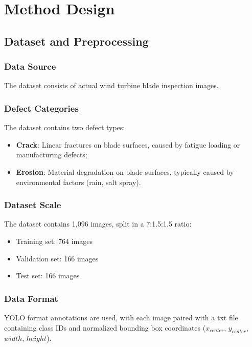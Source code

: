 \documentclass[12pt,a4paper]{article}
\begin{document}
\section{Method Design}

\subsection{Dataset and Preprocessing}

\subsubsection{Data Source}
The dataset consists of actual wind turbine blade inspection images.

\subsubsection{Defect Categories}
The dataset contains two defect types:
\begin{itemize}[noitemsep]
  \item \textbf{Crack}: Linear fractures on blade surfaces, caused by fatigue loading or manufacturing defects;
  \item \textbf{Erosion}: Material degradation on blade surfaces, typically caused by environmental factors (rain, salt spray).
\end{itemize}

\subsubsection{Dataset Scale}
The dataset contains 1,096 images, split in a 7:1.5:1.5 ratio:
\begin{itemize}[noitemsep]
  \item Training set: 764 images
  \item Validation set: 166 images
  \item Test set: 166 images
\end{itemize}

\subsubsection{Data Format}
YOLO format annotations are used, with each image paired with a txt file containing class IDs and normalized bounding box coordinates ($x_{center}$, $y_{center}$, $width$, $height$).
\end{document}
